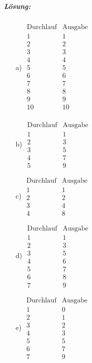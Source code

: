 \documentclass[12pt,a4paper,ngerman]{scrartcl}
\begin{document}
	\subparagraph{Lösung:}
	\begin{itemize}
		\item[a)] $\begin{array}{c|c}
				\text{Durchlauf} & \text{Ausgabe}\\
				\hline
				1 & 1\\
				2 & 2\\
				3 & 3\\
				4 & 4\\
				5 & 5\\
				6 & 6\\
				7 & 7\\
				8 & 8\\
				9 & 9\\
				10 & 10\\
			\end{array}$
		\item[b)] $\begin{array}{c|c}
				\text{Durchlauf} & \text{Ausgabe}\\
				\hline
				1 & 1\\
				2 & 3\\
				3 & 5\\
				4 & 7\\
				5 & 9
			\end{array}$
		\item[c)] $\begin{array}{c|c}
				\text{Durchlauf} & \text{Ausgabe}\\
				\hline
				1 & 1\\
				2 & 2\\
				3 & 4\\
				4 & 8
			\end{array}$
		\item[d)] $\begin{array}{c|c}
				\text{Durchlauf} & \text{Ausgabe}\\
				\hline
				1 & 1\\
				2 & 3\\
				3 & 5\\
				4 & 6\\
				5 & 7\\
				6 & 8\\
				7 & 9
			\end{array}$
		\item[e)] $\begin{array}{c|c}
				\text{Durchlauf} & \text{Ausgabe}\\
				\hline
				1 & 0\\
				2 & 1\\
				3 & 2\\
				4 & 3\\
				5 & 5\\
				6 & 7\\
				7 & 9
			\end{array}$
	\end{itemize}
\end{document}
